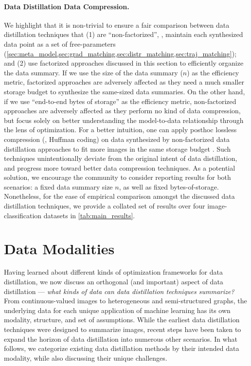 \documentclass[10pt]{article} %
\begin{document}
\paragraph{Data Distillation \vs Data Compression.} We highlight that it is non-trivial to ensure a fair comparison between data distillation techniques that (1) are ``non-factorized'', \ie, maintain each synthesized data point as a set of free-parameters (\cref{sec:meta_model,sec:grad_matching,sec:distr_matching,sec:traj_matching}); and (2) use factorized approaches discussed in this section to efficiently organize the data summary. If we use the size of the data summary ($n$) as the efficiency metric, factorized approaches are adversely affected as they need a much smaller storage budget to synthesize the same-sized data summaries. On the other hand, if we use ``end-to-end bytes of storage'' as the efficiency metric, non-factorized approaches are adversely affected as they perform no kind of data compression, but focus solely on better understanding the model-to-data relationship through the lens of optimization. For a better intuition, one can apply posthoc lossless compression (\eg, Huffman coding) on data synthesized by non-factorized data distillation approaches to fit more images in the same storage budget \citep{less_is_more}. Such techniques 
unintentionally deviate from the original intent of data distillation, and progress more toward better data compression techniques. 
As a potential solution,
we encourage the community to consider reporting results for both scenarios: a fixed data summary size $n$, as well as fixed bytes-of-storage. Nonetheless, for the ease of empirical comparison amongst the discussed data distillation techniques, we provide a collated set of results over four image-classification datasets in \cref{tab:main_results}.

\section{Data Modalities} \label{sec:data_modalities}
Having learned about different kinds of optimization frameworks for data distillation, we now discuss an orthogonal (and important) aspect of data distillation --- \emph{what kinds of data can data distillation techniques summarize?} From continuous-valued images to heterogeneous and semi-structured graphs, the underlying data for each unique application of machine learning has its own modality, structure, and set of assumptions. While the earliest data distillation techniques were designed to summarize images, recent steps have been taken to expand the horizon of data distillation into numerous other scenarios. In what follows, we categorize existing data distillation methods by their intended data modality, while also discussing their unique challenges.
\end{document}
